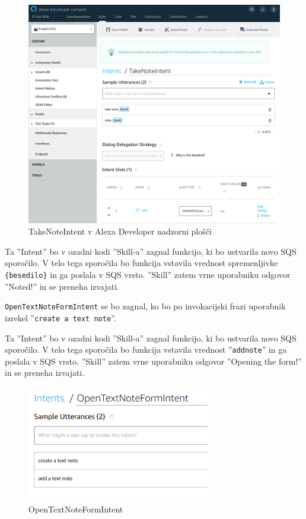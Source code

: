 \documentclass[a4paper, 12pt]{book}
\begin{document}
\begin{figure}[H]
\begin{center}
\includegraphics[width=13cm]{intent_literal}
\end{center}
\caption{TakeNoteIntent v Alexa Developer nadzorni plošči}
\label{TakeNoteIntent}
\end{figure}

Ta ''Intent'' bo v ozadni kodi ''Skill-a'' zagnal funkcijo, ki bo ustvarila novo SQS sporočilo.
V telo tega sporočila bo funkcija vstavila vrednost spremenljivke \texttt{\{besedilo\}} in ga poslala v SQS vrsto.
''Skill'' zatem vrne uporabniku odgovor ''Noted!'' in se preneha izvajati.

\texttt{OpenTextNoteFormIntent} se bo zagnal, ko bo po invokacijski frazi uporabnik izrekel ''\texttt{create a text note}''.

Ta ''Intent'' bo v ozadni kodi ''Skill-a'' zagnal funkcijo, ki bo ustvarila novo SQS sporočilo.
V telo tega sporočila bo funkcija vstavila vrednost ''\texttt{addnote}'' in ga poslala v SQS vrsto.
''Skill'' zatem vrne uporabniku odgovor ''Opening the form!'' in se preneha izvajati.


\begin{figure}[H]
\begin{center}
\includegraphics[width=8cm]{intent_text}
\end{center}
\caption{OpenTextNoteFormIntent}
\label{OpenTextNoteFormIntent}
\end{figure}
\end{document}
